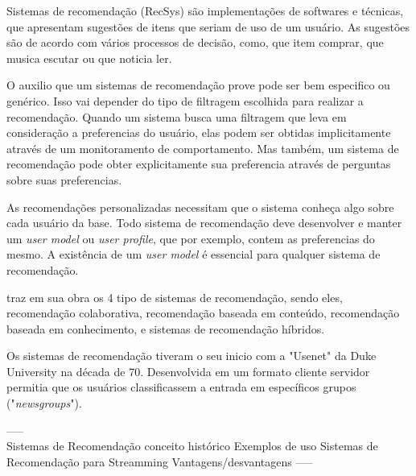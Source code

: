 \documentclass{article}
\begin{document}
Sistemas de recomendação (RecSys) são implementações de softwares e técnicas, que apresentam sugestões de itens que seriam de uso de um usuário. As sugestões são de acordo com vários processos de decisão, como, que item comprar, que musica escutar ou que noticia ler.  \cite{ricci2011introduction}

O auxilio que um sistemas de recomendação prove pode ser bem especifico ou genérico. Isso vai depender do tipo de filtragem escolhida para realizar a recomendação. Quando um sistema busca uma filtragem que leva em consideração a preferencias do usuário, elas podem ser obtidas implicitamente através de um monitoramento de comportamento. Mas também, um sistema de recomendação pode obter explicitamente sua preferencia através de perguntas sobre suas preferencias.
\cite{jannach2010recommender}

As recomendações personalizadas necessitam que o sistema conheça algo sobre cada usuário da base.
Todo sistema de recomendação deve desenvolver e manter um \textit{user model} ou \textit{user profile}, que por exemplo, contem as preferencias do mesmo.
A existência de um \textit{user model} é essencial para qualquer sistema de recomendação. \cite{jannach2010recommender}

\cite{ricci2011introduction} traz em sua obra os 4 tipo de sistemas de recomendação, sendo eles, recomendação colaborativa, recomendação baseada em conteúdo, recomendação baseada em conhecimento, e sistemas de recomendação híbridos.

Os sistemas de recomendação tiveram o seu inicio com a "Usenet" da Duke University na década de 70. \cite{bhatnagar2016collaborative} Desenvolvida em um formato cliente servidor permitia que os usuários classificassem a entrada em específicos grupos ("\textit{newsgroups}").

----- \\

Sistemas de Recomendação
   conceito
   histórico
   Exemplos de uso
   Sistemas de Recomendação para Streamming
   Vantagens/desvantagens
----- \\



\end{document}
